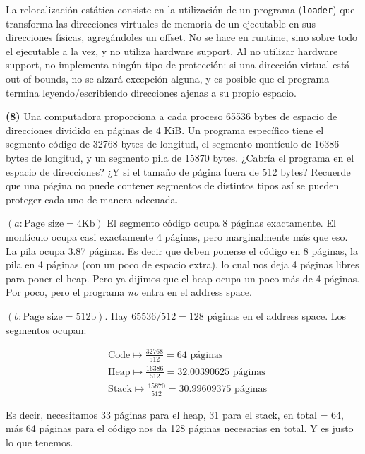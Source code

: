 \documentclass[12pt]{article}
\theoremstyle{definition}
\begin{document}
La relocalización estática consiste en la utilización de un programa
(\texttt{loader}) que transforma las direcciones virtuales de memoria de un
ejecutable en sus direcciones físicas, agregándoles un offset. No se hace en
runtime, sino sobre todo el ejecutable a la vez, y no utiliza hardware support.
Al no utilizar hardware support, no implementa ningún tipo de protección: si una
dirección virtual está out of bounds, no se alzará excepción alguna, y es
posible que el programa termina leyendo/escribiendo direcciones ajenas a su
propio espacio.


\pagebreak 

\begin{shaded}
    \textbf{(8)} Una computadora proporciona a cada proceso 65536 bytes de
    espacio de direcciones dividido en páginas de 4 KiB. Un programa específico
    tiene el segmento código de 32768 bytes de longitud, el segmento montículo
    de 16386 bytes de longitud, y un segmento pila de 15870 bytes. ¿Cabría el
    programa en el espacio de direcciones? ¿Y si el tamaño de página fuera de
    512 bytes? Recuerde que una página no puede contener segmentos de distintos
    tipos así se pueden proteger cada uno de manera adecuada.
\end{shaded}

$(a : \text{Page size} = 4\text{Kb})$ El segmento código ocupa 8 páginas
exactamente. El montículo ocupa casi exactamente 4 páginas, pero marginalmente
más que eso. La pila ocupa 3.87 páginas. Es decir que deben ponerse el código en
8 páginas, la pila en 4 páginas (con un poco de espacio extra), lo cual nos deja
4 páginas libres para poner el heap. Pero ya dijimos que el heap ocupa un poco
más de 4 páginas. Por poco, pero el programa \textit{no} entra en el address
space.

$(b: \text{Page size} = 512\text{b})$. Hay $65536 / 512 = 128$ páginas en el
address space. Los segmentos ocupan: 

\begin{align*}
    &\text{Code} \mapsto  \frac{32768}{512} = 64 \text{ páginas}\\ 
    &\text{Heap} \mapsto  \frac{16386}{512} = 32.00390625 \text{ páginas}\\ 
    &\text{Stack} \mapsto  \frac{15870}{512} = 30.99609375 \text{ páginas}
\end{align*}

Es decir, necesitamos 33 páginas para el heap, 31 para el stack, en total = 64,
más 64 páginas para el código nos da 128 páginas necesarias en total. Y es justo
lo que tenemos.
\end{document}
